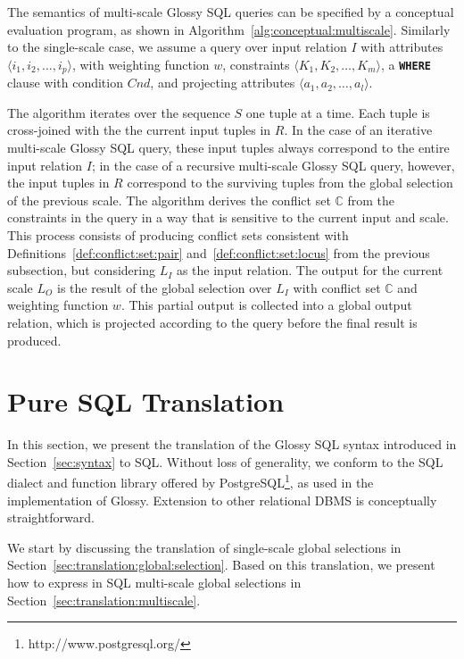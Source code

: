 \documentclass[11pt, oneside]{report}
\begin{document}
{The semantics of multi-scale Glossy SQL queries can be specified by a conceptual evaluation program, as shown in Algorithm~\ref{alg:conceptual:multiscale}. Similarly to the single-scale case, we assume a query over input relation $I$ with attributes $\langle i_1, i_2, \ldots, i_p \rangle$, with weighting function $w$, constraints $\langle K_1, K_2, \ldots, K_m\rangle$, a \textbf{\texttt{WHERE}} clause with condition $Cnd$, and projecting attributes $\langle a_1, a_2, \ldots, a_l \rangle$.   


The algorithm iterates over the sequence $S$ one tuple at a time. Each tuple is cross-joined with the the current input tuples in $R$. In the case of an iterative multi-scale Glossy SQL query, these input tuples always correspond to the entire input relation $I$; in the case of a recursive multi-scale Glossy SQL query, however, the input tuples in $R$ correspond to the surviving tuples from the global selection of the previous scale. The algorithm derives the conflict set $\mathbb{C}$ from the constraints in the query in a way that is sensitive to the current input and scale. This process consists of producing conflict sets consistent with Definitions~\ref{def:conflict:set:pair} and~\ref{def:conflict:set:locus} from the previous subsection, but considering $L_I$ as the input relation. The output for the current scale $L_O$ is the result of the global selection over $L_I$ with conflict set $\mathbb{C}$ and weighting function $w$. This partial output is collected into a global output relation, which is projected according to the query before the final result is produced.  

\section{Pure SQL Translation}
\label{sec:sql:translation}

In this section, we present the translation of the Glossy SQL syntax introduced in Section~\ref{sec:syntax} to SQL. Without loss of generality, we conform to the SQL dialect and function library offered by PostgreSQL\footnote{http://www.postgresql.org/}, as used in the implementation of Glossy. Extension to other relational DBMS is conceptually straightforward.  

We start by discussing the translation of single-scale global selections in Section~\ref{sec:translation:global:selection}. Based on this translation, we present how to express in SQL multi-scale global selections in Section~\ref{sec:translation:multiscale}.  

}
\end{document}
